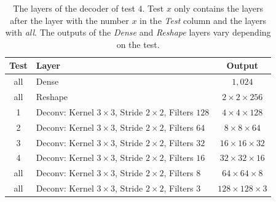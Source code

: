 \begin{center}
    \begin{table}[H]
        \centering
        \begin{tabular}{ | c | l | c | }
            \hline
            Test &Layer & Output\\ \hline
            all &Dense                                                            & $1,024$                   \\
            all &Reshape                                                          & $2\times 2\times    256$  \\
            1   &Deconv: Kernel $3\times3$, Stride $2\times2$, Filters $128$      & $4\times 4\times    128$  \\  
            2   &Deconv: Kernel $3\times3$, Stride $2\times2$, Filters $64 $      & $8\times 8\times    64 $  \\
            3   &Deconv: Kernel $3\times3$, Stride $2\times2$, Filters $32 $      & $16\times 16\times  32 $  \\
            4   &Deconv: Kernel $3\times3$, Stride $2\times2$, Filters $16 $      & $32\times 32\times  16 $  \\
            all &Deconv: Kernel $3\times3$, Stride $2\times2$, Filters $8  $      & $64\times 64\times  8  $  \\
            all &Deconv: Kernel $3\times3$, Stride $2\times2$, Filters $3  $      & $128\times 128\times3  $  \\
            \hline
        \end{tabular} 
        \caption{The layers of the decoder of test $4$. 
        Test $x$ only contains the layers after the layer with the number
        $x$ in the \textit{Test} column and the layers with \textit{all}.
        The outputs of the \textit{Dense} and \textit{Reshape}
        layers vary depending on the test.}
    \end{table}
\end{center}

